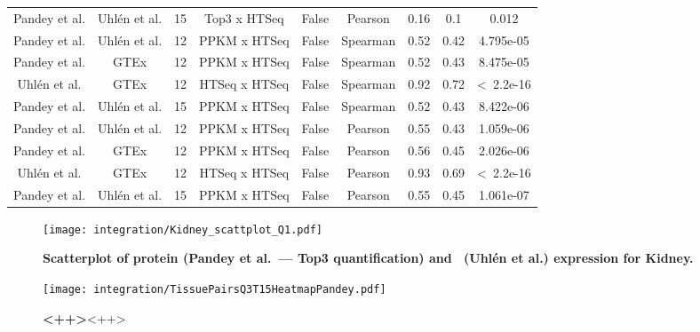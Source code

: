 \begin{landscape}
\begin{longtable}{@{}ccccccccc@{}}
Pandey et al. & Uhlén et al. & 15 & Top3 x HTSeq & False & Pearson & 0.16 & 0.1 & 0.012 \\
Pandey et al. & Uhlén et al. & 12 & PPKM x HTSeq & False & Spearman & 0.52 & 0.42 & 4.795e-05 \\
Pandey et al. & GTEx & 12 & PPKM x HTSeq & False & Spearman & 0.52 & 0.43 & 8.475e-05 \\
{\color[HTML]{9B9B9B} Uhlén et al.} & {\color[HTML]{9B9B9B} GTEx} & {\color[HTML]{9B9B9B} 12} & {\color[HTML]{9B9B9B} HTSeq x HTSeq} & {\color[HTML]{9B9B9B} False} & {\color[HTML]{9B9B9B} Spearman} & {\color[HTML]{9B9B9B} 0.92} & {\color[HTML]{9B9B9B} 0.72} & {\color[HTML]{9B9B9B} \textless\ 2.2e-16} \\
Pandey et al. & Uhlén et al. & 15 & PPKM x HTSeq & False & Spearman & 0.52 & 0.43 & 8.422e-06 \\
Pandey et al. & Uhlén et al. & 12 & PPKM x HTSeq & False & Pearson & 0.55 & 0.43 & 1.059e-06 \\
Pandey et al. & GTEx & 12 & PPKM x HTSeq & False & Pearson & 0.56 & 0.45 & 2.026e-06 \\
{\color[HTML]{9B9B9B} Uhlén et al.} & {\color[HTML]{9B9B9B} GTEx} & {\color[HTML]{9B9B9B} 12} & {\color[HTML]{9B9B9B} HTSeq x HTSeq} & {\color[HTML]{9B9B9B} False} & {\color[HTML]{9B9B9B} Pearson} & {\color[HTML]{9B9B9B} 0.93} & {\color[HTML]{9B9B9B} 0.69} & {\color[HTML]{9B9B9B} \textless\ 2.2e-16} \\
Pandey et al. & Uhlén et al. & 15 & PPKM x HTSeq & False & Pearson & 0.55 & 0.45 & 1.061e-07 \\* \bottomrule
\end{longtable}
\end{landscape}

\pagestyle{scrheadings}


\begin{figure}[!htpb]
    \texttt{[image: integration/Kidney\_scattplot\_Q1.pdf]}\centering
    \caption[Scatterplot of protein (Pandey et al.\ --- Top3 quantification)
    and \mRNA\ (Uhlén et al.) expression for Kidney]{\label{fig:ScatKidQ1}%
    \textbf{Scatterplot of protein (Pandey et al.\ --- Top3 quantification)
    and \mRNA\ (Uhlén et al.) expression for Kidney.}}
\end{figure}




\begin{figure}[!htb]
    \texttt{[image: integration/TissuePairsQ3T15HeatmapPandey.pdf]}\centering
    \caption[Heatmap]{\label{fig:heatmapPandeyTissuePairs}\textbf{<++>}<++>}
\end{figure}

